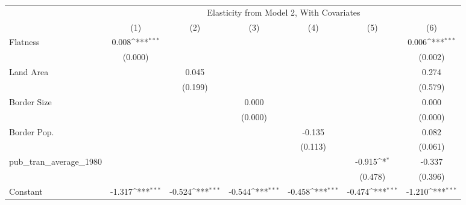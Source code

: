 {
\def\sym#1{\ifmmode^{#1}\else\(^{#1}\)\fi}
\begin{tabular}{l*{6}{c}}
\hline\hline
            &\multicolumn{6}{c}{Elasticity from Model 2, With Covariates}                                                                       \\
            &\multicolumn{1}{c}{(1)}         &\multicolumn{1}{c}{(2)}         &\multicolumn{1}{c}{(3)}         &\multicolumn{1}{c}{(4)}         &\multicolumn{1}{c}{(5)}         &\multicolumn{1}{c}{(6)}         \\
\hline
Flatness    &       0.008\sym{***}&                     &                     &                     &                     &       0.006\sym{***}\\
            &     (0.000)         &                     &                     &                     &                     &     (0.002)         \\
[1em]
Land Area   &                     &       0.045         &                     &                     &                     &       0.274         \\
            &                     &     (0.199)         &                     &                     &                     &     (0.579)         \\
[1em]
Border Size &                     &                     &       0.000         &                     &                     &       0.000         \\
            &                     &                     &     (0.000)         &                     &                     &     (0.000)         \\
[1em]
Border Pop. &                     &                     &                     &      -0.135         &                     &       0.082         \\
            &                     &                     &                     &     (0.113)         &                     &     (0.061)         \\
[1em]
pub\_tran\_average\_1980&                     &                     &                     &                     &      -0.915\sym{*}  &      -0.337         \\
            &                     &                     &                     &                     &     (0.478)         &     (0.396)         \\
[1em]
Constant    &      -1.317\sym{***}&      -0.524\sym{***}&      -0.544\sym{***}&      -0.458\sym{***}&      -0.474\sym{***}&      -1.210\sym{***}\\

\end{tabular}}
